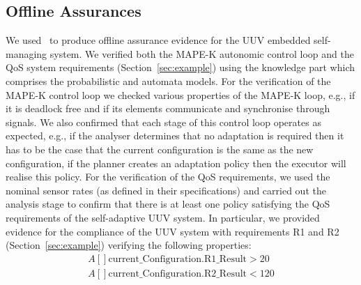 \subsection{Offline Assurances}
We used \approach\ to produce offline assurance evidence for the UUV embedded self-managing system. We verified both the MAPE-K autonomic control loop and the QoS system requirements (Section~\ref{sec:example}) using the knowledge part which comprises the probabilistic and automata models. For the verification of the MAPE-K control loop we checked various properties of the MAPE-K loop, e.g., if it is deadlock free and if its elements communicate and synchronise through signals. We also confirmed that each stage of this control loop operates as expected, e.g., if the analyser determines that no adaptation is required then it has to be the case that the current configuration is the same as the new configuration, if the planner creates an adaptation policy then the executor will realise this policy. For the verification of the QoS requirements, we used the nominal sensor rates (as defined in their specifications) and carried out the analysis stage to confirm that there is at least one policy satisfying the QoS requirements of the self-adaptive UUV system. In particular, we provided evidence for the compliance of the UUV system with requirements R1 and R2 (Section~\ref{sec:example}) verifying the following properties:
\begin{align*}
	A[] \textrm{current\_Configuration.R1\_Result} > 20 \ \\
	A[] \textrm{current\_Configuration.R2\_Result} < 120 
\end{align*}


